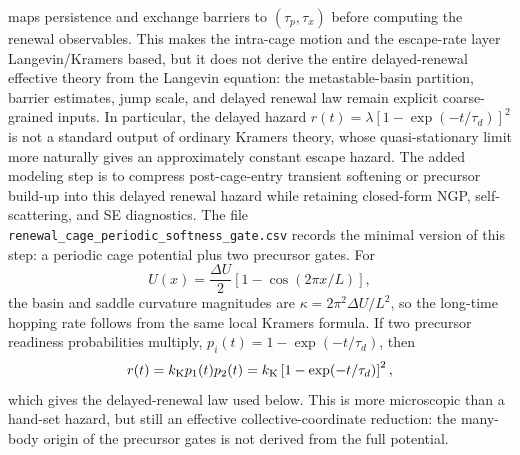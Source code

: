 \documentclass[aps,preprint,onecolumn,superscriptaddress,nofootinbib]{revtex4-2}
\begin{document}
maps persistence and exchange barriers to $(\tau_p,\tau_x)$ before computing
the renewal observables. This makes the intra-cage motion and the escape-rate
layer Langevin/Kramers based, but it does not derive the entire delayed-renewal
effective theory from the Langevin equation: the metastable-basin partition,
barrier estimates, jump scale, and delayed renewal law remain explicit
coarse-grained inputs.
In particular, the delayed hazard
$r(t)=\lambda[1-\exp(-t/\tau_d)]^2$ is not a standard output of ordinary Kramers theory, whose quasi-stationary limit more naturally gives an
approximately constant escape hazard. The added modeling step is to compress
post-cage-entry transient softening or precursor build-up into this delayed
renewal hazard while retaining closed-form NGP, self-scattering, and SE diagnostics.
The file \texttt{renewal\_cage\_periodic\_softness\_gate.csv} records the
minimal version of this step: a periodic cage potential plus two precursor gates.
For
\begin{equation}
  U(x)=\frac{\Delta U}{2}\left[1-\cos(2\pi x/L)\right],
\end{equation}
the basin and saddle curvature magnitudes are
$\kappa=2\pi^2\Delta U/L^2$, so the long-time hopping rate follows from the
same local Kramers formula. If two precursor readiness probabilities multiply,
$p_i(t)=1-\exp(-t/\tau_d)$, then
\begin{equation}
  r(t)=k_{\rm K}p_1(t)p_2(t)
      =k_{\rm K}\left[1-\exp(-t/\tau_d)\right]^2,
\end{equation}
which gives the delayed-renewal law used below. This is more microscopic than
a hand-set hazard, but still an effective collective-coordinate reduction: the
many-body origin of the precursor gates is not derived from the full potential.
\end{document}
